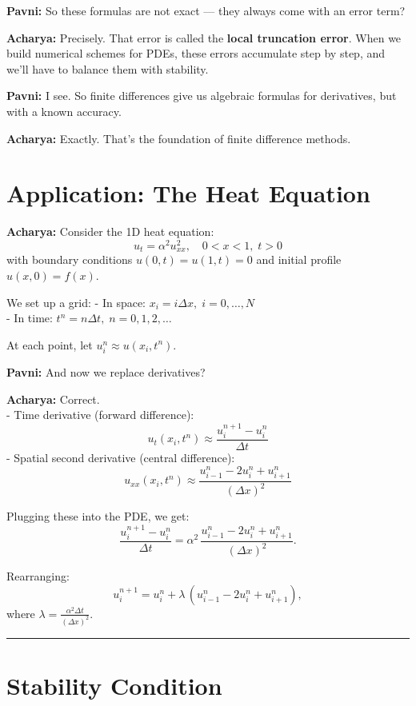 \documentclass[
  letterpaper,
]{book}
\begin{document}
\textbf{Pavni:} So these formulas are not exact --- they always come
with an error term?

\textbf{Acharya:} Precisely. That error is called the \textbf{local
truncation error}. When we build numerical schemes for PDEs, these
errors accumulate step by step, and we'll have to balance them with
stability.

\textbf{Pavni:} I see. So finite differences give us algebraic formulas
for derivatives, but with a known accuracy.

\textbf{Acharya:} Exactly. That's the foundation of finite difference
methods.

\section{Application: The Heat
Equation}\label{application-the-heat-equation}

\textbf{Acharya:} Consider the 1D heat equation: \[
u_t = \alpha^2 u_{xx}^2, \quad 0 < x < 1,\; t>0
\] with boundary conditions \(u(0,t) = u(1,t) = 0\) and initial profile
\(u(x,0) = f(x)\).

We set up a grid: - In space: \(x_i = i\Delta x,\; i=0,\dots,N\)\\
- In time: \(t^n = n\Delta t,\; n=0,1,2,\dots\)

At each point, let \(u_i^n \approx u(x_i,t^n)\).

\textbf{Pavni:} And now we replace derivatives?

\textbf{Acharya:} Correct.\\
- Time derivative (forward difference): \[
  u_t(x_i,t^n) \approx \frac{u_i^{n+1} - u_i^n}{\Delta t}
  \] - Spatial second derivative (central difference): \[
  u_{xx}(x_i,t^n) \approx \frac{u_{i-1}^n - 2u_i^n + u_{i+1}^n}{(\Delta x)^2}
  \]

Plugging these into the PDE, we get: \[
\frac{u_i^{n+1} - u_i^n}{\Delta t} = \alpha^2 \,\frac{u_{i-1}^n - 2u_i^n + u_{i+1}^n}{(\Delta x)^2}.
\]

Rearranging: \[
u_i^{n+1} = u_i^n + \lambda\,(u_{i-1}^n - 2u_i^n + u_{i+1}^n),
\] where \(\lambda = \frac{\alpha^2 \Delta t}{(\Delta x)^2}\).

\begin{center}\rule{0.5\linewidth}{0.5pt}\end{center}

\section{Stability Condition}\label{stability-condition}
\end{document}
